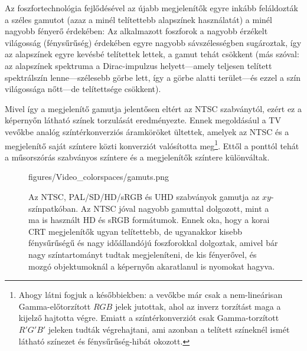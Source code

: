 \vspace{3mm}
Az foszfortechnológia fejlődésével az újabb megjelenítők egyre inkább feláldozták a széles gamutot (azaz a minél telítettebb alapszínek használatát) a minél nagyobb fényerő érdekében: 
Az alkalmazott foszforok a nagyobb érzékelt világosság (fénysűrűség) érdekében egyre nagyobb sávszélességben sugároztak, így az alapszínek egyre kevésbé telítettek lettek, a gamut tehát csökkent (más szóval: az alapszínek spektruma a Dirac-impulzus helyett---amely teljesen telített spektrálszín lenne---szélesebb görbe lett, így a görbe alatti terület---és ezzel a szín világossága nőtt---de telítettsége csökkent).

Mivel így a megjelenítő gamutja jelentősen eltért az NTSC szabványtól, ezért ez a képernyőn látható színek torzulását eredményezte.
Ennek megoldásául a TV vevőkbe analóg színtérkonverziós áramköröket ültettek, amelyek az NTSC és a megjelenítő saját színtere közti konverziót valósította meg\footnote{Ahogy látni fogjuk a későbbiekben: a vevőkbe már csak a nem-lineárisan Gamma-előtorzított $RGB$ jelek jutottak, ahol az inverz torzítást maga a kijelző hajtotta végre. Emiatt a színtérkonverziót csak Gamma-torzított $R'G'B'$ jeleken tudták végrehajtani, ami azonban a telített színeknél ismét látható színezet és fénysűrűség-hibát okozott.}.
Ettől a ponttól tehát a műsorszórás szabványos színtere és a megjelenítők színtere különváltak.

\begin{figure}[]
	\centering
	\begin{overpic}[width = 0.7\columnwidth ]{figures/Video_colorspaces/gamuts.png}
	\end{overpic}
	\caption{Az NTSC, PAL/SD/HD/sRGB és UHD szabványok gamutja az $xy$-színpatkóban.
	Az NTSC jóval nagyobb gamuttal dolgozott, mint a ma is használt HD és sRGB formátumok. Ennek oka, hogy a korai CRT megjelenítők ugyan telítettebb, de ugyanakkor kisebb fénysűrűségű és nagy időállandójú foszforokkal dolgoztak, amivel bár nagy színtartományt tudtak megjeleníteni, de kis fényerővel, és mozgó objektumoknál a képernyőn akaratlanul is nyomokat hagyva.}
	\label{Fig:gamut}
\end{figure}
